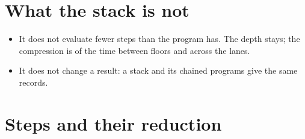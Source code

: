 \section{\texorpdfstring{What the stack is not}{What the stack is not}}

\begin{itemize}
\item It does not evaluate fewer steps than the program has. The depth stays; the compression is of the time between floors and across the lanes.
\item It does not change a result: a stack and its chained programs give the same records.
\end{itemize}

\section{\texorpdfstring{Steps and their reduction}{Steps and their reduction}}


